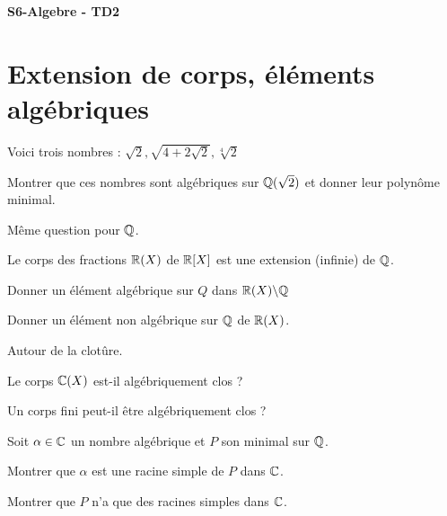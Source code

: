 \documentclass[french]{report}
\begin{document}
\begin{center}
    \huge{\textbf{S6-Algebre - TD2}}
\end{center}

\section*{Extension de corps, éléments algébriques}

\begin{exo}
    Voici trois nombres : \(\sqrt{2}, \sqrt{4+2\sqrt{2}}, \sqrt[4]{2}\)
    \begin{q}{1}
        Montrer que ces nombres sont algébriques sur \(\mathbb{Q}(\sqrt{2})\) et donner leur
        polynôme minimal.
    \end{q}
    \begin{q}{2}
        Même question pour \(\mathbb{Q}\).
    \end{q}
\end{exo}

\begin{exo}
    Le corps des fractions \(\mathbb{R}(X)\) de \(\mathbb{R}[X]\) est une extension (infinie) de \(\mathbb{Q}\).
    \begin{q}{1}
        Donner un élément algébrique sur \(Q\) dans \(\mathbb{R}(X)\backslash\mathbb{Q}\)
    \end{q}
    \begin{q}{2}
        Donner un élément non algébrique sur \(\mathbb{Q}\) de \(\mathbb{R}(X)\).
    \end{q}
\end{exo}

\begin{exo}
    Autour de la clotûre.
    \begin{q}{1}
        Le corps \(\mathbb{C}(X)\) est-il algébriquement clos ?
    \end{q}
    \begin{q}{2}
        Un corps fini peut-il être algébriquement clos ?
    \end{q}
\end{exo}

\begin{exo}
    Soit \(\alpha\in\mathbb{C}\) un nombre algébrique et \(P\) son
    minimal sur \(\mathbb{Q}\).
    \begin{q}{1}
        Montrer que \(\alpha\) est une racine simple de \(P\) dans \(\mathbb{C}\).
    \end{q}
    \begin{q}{2}
        Montrer que \(P\) n'a que des racines simples dans \(\mathbb{C}\).
    \end{q}
\end{exo}
\end{document}

